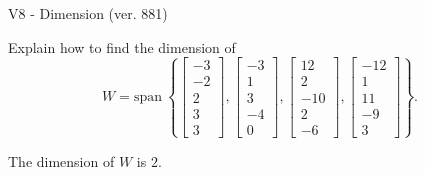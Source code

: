 \begin{exercise}
  \begin{exerciseTitle}V8 - Dimension (ver. 881)\end{exerciseTitle}
  \begin{exerciseStatement}
    Explain how to find the dimension of 
\[W=\mathrm{span}\ \left\{\left[\begin{array}{r}
-3 \\
-2 \\
2 \\
3 \\
3
\end{array}\right] , \left[\begin{array}{r}
-3 \\
1 \\
3 \\
-4 \\
0
\end{array}\right] , \left[\begin{array}{r}
12 \\
2 \\
-10 \\
2 \\
-6
\end{array}\right] , \left[\begin{array}{r}
-12 \\
1 \\
11 \\
-9 \\
3
\end{array}\right]\right\}.\]



  \end{exerciseStatement}
  \begin{exerciseAnswer}
   The dimension of \(W\) is  \(2\).
  


  \end{exerciseAnswer}
\end{exercise}